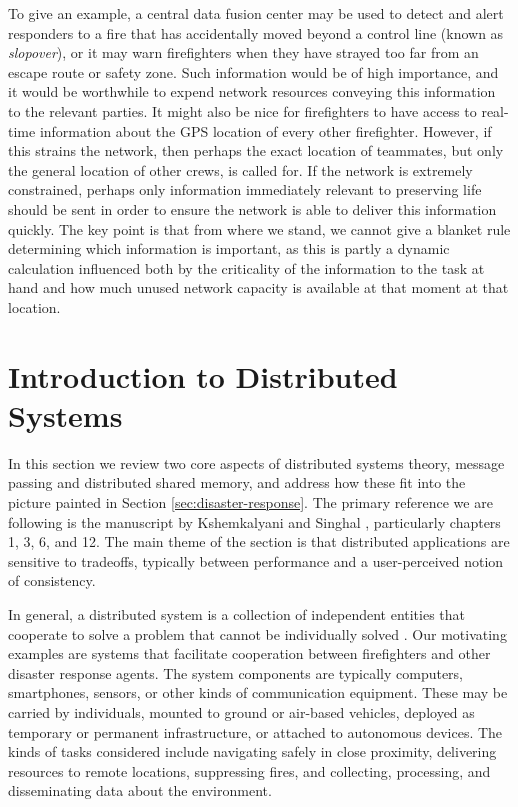 \documentclass[]             %
{NASA}                       %
\theoremstyle{definition}
\begin{document}
To give an example, a central data fusion center may be used to detect
and alert responders to a fire that has accidentally moved beyond a
control line (known as \emph{slopover}), or it may warn firefighters
when they have strayed too far from an escape route or safety
zone. Such information would be of high importance, and it would be
worthwhile to expend network resources conveying this information to
the relevant parties. It might also be nice for firefighters to have
access to real-time information about the GPS location of every other
firefighter. However, if this strains the network, then perhaps the
exact location of teammates, but only the general location of other
crews, is called for. If the network is extremely constrained, perhaps
only information immediately relevant to preserving life should be
sent in order to ensure the network is able to deliver this
information quickly. The key point is that from where we stand, we
cannot give a blanket rule determining which information is important,
as this is partly a dynamic calculation influenced both by the
criticality of the information to the task at hand and how much unused
network capacity is available at that moment at that location.


\section{Introduction to Distributed Systems}
\label{sec:background}
In this section we review two core aspects of distributed systems
theory, message passing and distributed shared memory, and address how
these fit into the picture painted in Section
\ref{sec:disaster-response}. The primary reference we are following is
the manuscript by Kshemkalyani and Singhal
\cite{kshemkalyani_singhal_2008}, particularly chapters 1, 3, 6, and
12. The main theme of the section is that distributed applications are
sensitive to tradeoffs, typically between performance and a
user-perceived notion of consistency.

In general, a distributed system is a collection of independent
entities that cooperate to solve a problem that cannot be individually
solved \cite{kshemkalyani_singhal_2008}. Our motivating examples are
systems that facilitate cooperation between firefighters and other
disaster response agents.  The system components are typically
computers, smartphones, sensors, or other kinds of communication
equipment. These may be carried by individuals, mounted to ground or
air-based vehicles, deployed as temporary or permanent infrastructure,
or attached to autonomous devices. The kinds of tasks considered
include navigating safely in close proximity, delivering resources to
remote locations, suppressing fires, and collecting, processing, and
disseminating data about the environment.
\end{document}
